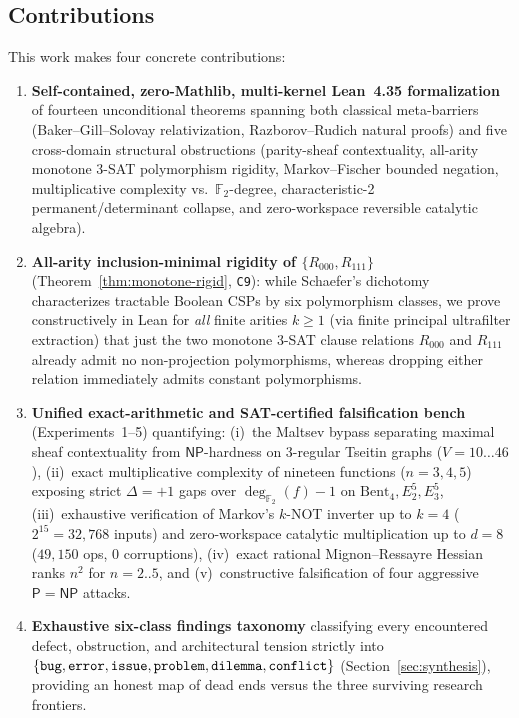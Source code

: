 \documentclass[11pt,reqno]{amsart}
\theoremstyle{definition}
\newcommand{\F}{\mathbb{F}}
\newcommand{\PP}{\mathsf{P}}
\newcommand{\NP}{\mathsf{NP}}
\begin{document}
\subsection{Contributions}
This work makes four concrete contributions:
\begin{enumerate}[leftmargin=1.6em]
\item \textbf{Self-contained, zero-Mathlib, multi-kernel Lean~4.35 formalization}
      of fourteen unconditional theorems spanning both classical meta-barriers
      (Baker--Gill--Solovay relativization, Razborov--Rudich natural proofs) and five
      cross-domain structural obstructions (parity-sheaf contextuality, all-arity
      monotone 3-SAT polymorphism rigidity, Markov--Fischer bounded negation,
      multiplicative complexity vs.\ $\F_2$-degree, characteristic-2 permanent/determinant
      collapse, and zero-workspace reversible catalytic algebra).
\item \textbf{All-arity inclusion-minimal rigidity of $\{R_{000}, R_{111}\}$}
      (Theorem~\ref{thm:monotone-rigid}, \texttt{C9}): while Schaefer's dichotomy
      characterizes tractable Boolean CSPs by six polymorphism classes, we prove
      constructively in Lean for \emph{all} finite arities $k \ge 1$ (via finite
      principal ultrafilter extraction) that just the two monotone 3-SAT clause relations
      $R_{000}$ and $R_{111}$ already admit no non-projection polymorphisms, whereas
      dropping either relation immediately admits constant polymorphisms.
\item \textbf{Unified exact-arithmetic and SAT-certified falsification bench}
      (Experiments~1--5) quantifying: (i)~the Maltsev bypass separating maximal sheaf
      contextuality from $\NP$-hardness on 3-regular Tseitin graphs ($V=10\dots 46$),
      (ii)~exact multiplicative complexity of nineteen functions ($n=3,4,5$) exposing
      strict $\Delta=+1$ gaps over $\deg_{\F_2}(f)-1$ on $\mathrm{Bent}_4, E_2^5, E_3^5$,
      (iii)~exhaustive verification of Markov's $k$-NOT inverter up to $k=4$
      ($2^{15}=32{,}768$ inputs) and zero-workspace catalytic multiplication up to
      $d=8$ ($49{,}150$ ops, 0 corruptions), (iv)~exact rational Mignon--Ressayre
      Hessian ranks $n^2$ for $n=2..5$, and (v)~constructive falsification of four
      aggressive $\PP=\NP$ attacks.
\item \textbf{Exhaustive six-class findings taxonomy} classifying every encountered
      defect, obstruction, and architectural tension strictly into
      $\{\text{\texttt{bug}}, \text{\texttt{error}}, \text{\texttt{issue}},
      \text{\texttt{problem}}, \text{\texttt{dilemma}}, \text{\texttt{conflict}}\}$
      (Section~\ref{sec:synthesis}), providing an honest map of dead ends versus the
      three surviving research frontiers.
\end{enumerate}
\end{document}
